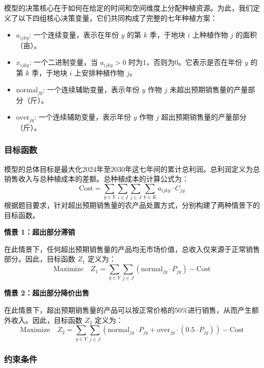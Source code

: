 模型的决策核心在于如何在给定的时间和空间维度上分配种植资源。为此，我们定义了以下四组核心决策变量，它们共同构成了完整的七年种植方案：
\begin{itemize}
    \item $a_{ijky}$: 一个连续变量，表示在年份 $y$ 的第 $k$ 季，于地块 $i$ 上种植作物 $j$ 的面积（亩）。
    \item $x_{ijky}$: 一个二进制变量，当 $a_{ijky} > 0$ 时为1，否则为0。它表示是否在年份 $y$ 的第 $k$ 季，于地块 $i$ 上安排种植作物 $j$。
    \item $\text{normal}_{jy}$: 一个连续辅助变量，表示年份 $y$ 作物 $j$ 未超出预期销售量的产量部分（斤）。
    \item $\text{over}_{jy}$: 一个连续辅助变量，表示年份 $y$ 作物 $j$ 超出预期销售量的产量部分（斤）。
\end{itemize}



\subsubsection{目标函数}

模型的总体目标是最大化2024年至2030年这七年间的累计总利润。总利润定义为总销售收入与总种植成本的差额。总种植成本的计算公式为：
\begin{equation}
\text{Cost} = \sum_{y \in Y} \sum_{i \in I} \sum_{j \in J} \sum_{k \in K} a_{ijky} \cdot C_{jy}
\end{equation}
根据题目要求，针对超出预期销售量的农产品处置方式，分别构建了两种情景下的目标函数。

\textbf{情景 1：超出部分滞销}

在此情景下，任何超出预期销售量的产品均无市场价值，总收入仅来源于正常销售部分。因此，目标函数 $Z_1$ 定义为：
\begin{equation}
\text{Maximize} \quad Z_1 = \sum_{y \in Y} \sum_{j \in J} (\text{normal}_{jy} \cdot P_{jy}) - \text{Cost}
\end{equation}

\textbf{情景 2：超出部分降价出售}

在此情景下，超出预期销售量的产品可以按正常价格的50\%进行销售，从而产生额外收入。因此，目标函数 $Z_2$ 定义为：
\begin{equation}
\text{Maximize} \quad Z_2 = \sum_{y \in Y} \sum_{j \in J} (\text{normal}_{jy} \cdot P_{jy} + \text{over}_{jy} \cdot (0.5 \cdot P_{jy})) - \text{Cost}
\end{equation}

\subsubsection{约束条件}

